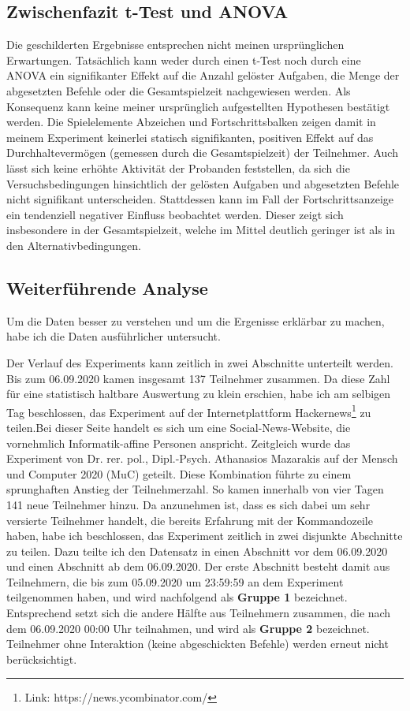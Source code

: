 \subsection{Zwischenfazit t-Test und ANOVA}
Die geschilderten Ergebnisse entsprechen nicht meinen ursprünglichen Erwartungen. Tatsächlich kann weder durch einen t-Test noch durch eine ANOVA ein signifikanter Effekt auf die Anzahl gelöster Aufgaben, die Menge der abgesetzten Befehle oder die Gesamtspielzeit nachgewiesen werden. Als Konsequenz kann keine meiner ursprünglich aufgestellten Hypothesen bestätigt werden. Die Spielelemente Abzeichen und Fortschrittsbalken zeigen damit in meinem Experiment keinerlei statisch signifikanten, positiven Effekt auf das Durchhaltevermögen (gemessen durch die Gesamtspielzeit) der Teilnehmer. Auch lässt sich keine erhöhte Aktivität der Probanden feststellen, da sich die Versuchsbedingungen hinsichtlich der gelösten Aufgaben und abgesetzten Befehle nicht signifikant unterscheiden. Stattdessen kann im Fall der Fortschrittsanzeige ein tendenziell negativer Einfluss beobachtet werden. Dieser zeigt sich insbesondere in der Gesamtspielzeit, welche im Mittel deutlich geringer ist als in den Alternativbedingungen. 

\subsection{Weiterführende Analyse}
Um die Daten besser zu verstehen und um die Ergenisse erklärbar zu machen, habe ich die Daten ausführlicher untersucht.

Der Verlauf des Experiments kann zeitlich in zwei Abschnitte unterteilt werden. Bis zum 06.09.2020 kamen insgesamt 137 Teilnehmer zusammen. Da diese Zahl für eine statistisch haltbare Auswertung zu klein erschien, habe ich am selbigen Tag beschlossen, das Experiment auf der Internetplattform Hackernews\footnote{Link: https://news.ycombinator.com/} zu teilen.Bei dieser Seite handelt es sich um eine Social-News-Website, die vornehmlich Informatik-affine Personen anspricht. Zeitgleich wurde das Experiment von 	Dr. rer. pol., Dipl.-Psych. Athanasios Mazarakis auf der Mensch und Computer 2020 (MuC) geteilt. Diese Kombination führte zu einem sprunghaften Anstieg der Teilnehmerzahl. So kamen innerhalb von vier Tagen 141 neue Teilnehmer hinzu. Da anzunehmen ist, dass es sich dabei um sehr versierte Teilnehmer handelt, die bereits Erfahrung mit der Kommandozeile haben, habe ich beschlossen,
das Experiment zeitlich in zwei disjunkte Abschnitte zu teilen. Dazu teilte ich den Datensatz in einen Abschnitt vor dem 06.09.2020 und einen Abschnitt ab dem 06.09.2020. Der erste Abschnitt besteht damit aus Teilnehmern, die bis zum 05.09.2020 um 23:59:59 an dem Experiment teilgenommen haben, und wird nachfolgend als \textbf{Gruppe 1} bezeichnet. Entsprechend setzt sich die andere Hälfte aus Teilnehmern zusammen, die nach dem 06.09.2020 00:00 Uhr teilnahmen, und wird als \textbf{Gruppe 2} bezeichnet. Teilnehmer ohne Interaktion (keine abgeschickten Befehle) werden erneut nicht berücksichtigt.

